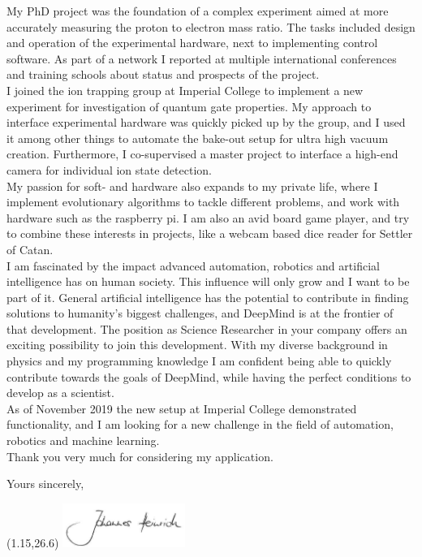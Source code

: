 \documentclass[10pt, a4paper]{class_cover_letter}
\begin{document}
My PhD project was the foundation of a complex experiment aimed at more accurately measuring the proton to electron mass ratio. The tasks included design and operation of the experimental hardware, next to implementing control software. As part of a network I reported at multiple international conferences and training schools about status and prospects of the project.\\

I joined the ion trapping group at Imperial College to implement a new experiment for investigation of quantum gate properties. My approach to interface experimental hardware was quickly picked up by the group, and I used it among other things to automate the bake-out setup for ultra high vacuum creation. Furthermore, I co-supervised a master project to interface a high-end camera for individual ion state detection.\\

My passion for soft- and hardware also expands to my private life, where I implement evolutionary algorithms to tackle different problems, and work with hardware such as the raspberry pi. I am also an avid board game player, and try to combine these interests in projects, like a webcam based dice reader for Settler of Catan.\\

I am fascinated by the impact advanced automation, robotics and artificial intelligence has on human society. This influence will only grow and I want to be part of it. General artificial intelligence has the potential to contribute in finding solutions to humanity's biggest challenges, and DeepMind is at the frontier of that development. The position as Science Researcher in your company offers an exciting possibility to join this development. With my diverse background in physics and my programming knowledge I am confident being able to quickly contribute towards the goals of DeepMind, while having the perfect conditions to develop as a scientist.\\

As of November 2019 the new setup at Imperial College demonstrated functionality, and I am looking for a new challenge in the field of automation, robotics and machine learning.\\

Thank you very much for considering my application.

\vspace{0.7cm}
Yours sincerely,

\begin{textblock}{10}(1.15,26.6)
\includegraphics[width=4cm]{unterschrift.png}
\end{textblock}
\end{document}
